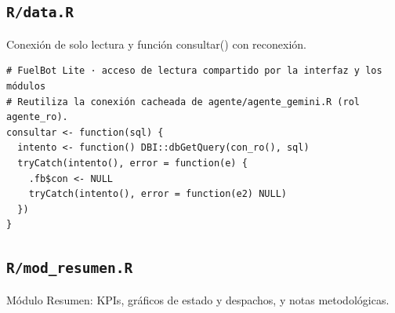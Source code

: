 \subsection{\texttt{R/data.R}}
Conexión de solo lectura y función consultar() con reconexión.
\begin{lstlisting}[style=anexoR]
# FuelBot Lite · acceso de lectura compartido por la interfaz y los módulos
# Reutiliza la conexión cacheada de agente/agente_gemini.R (rol agente_ro).
consultar <- function(sql) {
  intento <- function() DBI::dbGetQuery(con_ro(), sql)
  tryCatch(intento(), error = function(e) {
    .fb$con <- NULL
    tryCatch(intento(), error = function(e2) NULL)
  })
}
\end{lstlisting}

\subsection{\texttt{R/mod\_resumen.R}}
Módulo Resumen: KPIs, gráficos de estado y despachos, y notas metodológicas.
